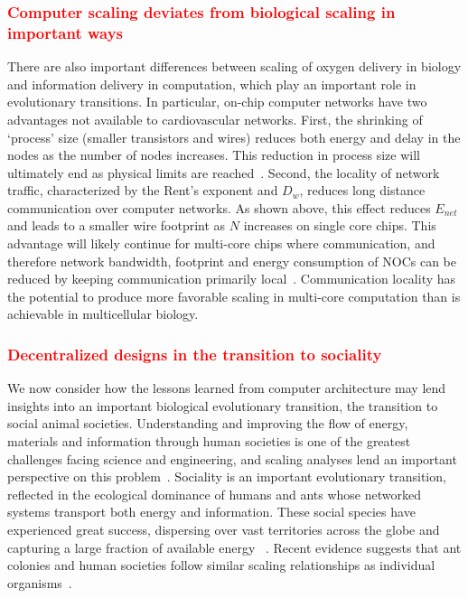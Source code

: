 \documentclass[12pt]{article}
\newcommand{\red}[1]{\textcolor{red}{#1}}
\begin{document}
\red{\subsubsection{Computer scaling deviates from biological scaling in important ways}} There are also important differences between scaling of oxygen delivery in biology and information
delivery in computation, which play an important role in evolutionary
transitions. In particular, on-chip computer networks have two advantages not
available to cardiovascular networks.  First, the shrinking of
`process' size (smaller
transistors and wires) reduces both energy and
delay in the nodes as the number of nodes increases.
This reduction in process size will ultimately end
as physical limits are reached~\cite{waldrop2016chips}.
Second, the locality of
network traffic, characterized by the Rent's exponent and $D_w$, reduces long
distance communication over computer networks. As shown above, this
effect
reduces $E_{net}$ and leads to a smaller wire footprint as $N$
increases on single core chips. This advantage will likely continue for
multi-core chips where communication, and therefore network bandwidth,
footprint and energy consumption of NOCs can be reduced by keeping
communication primarily local~\cite{bezerra2010modeling, zarkesh2010hybrid}. Communication locality
has the potential to produce more favorable scaling in multi-core
computation than is achievable in multicellular biology.

\red{\subsubsection{Decentralized designs in the transition to sociality}}  We now
consider how the lessons learned from computer architecture may lend insights into an important
biological evolutionary transition, the transition to social animal societies. Understanding and improving the flow of energy, materials and information through human societies is one of the greatest challenges facing science and engineering, and scaling analyses lend an important perspective on this problem~\cite{moses2012beyond}.
Sociality is an important evolutionary transition, reflected in the
ecological dominance of humans and ants whose networked
systems transport both energy and information. These social species have experienced great success, dispersing over vast territories across the globe and capturing a large
fraction of available energy ~\cite{haberl2007quantifying, holldobler1990ants}. Recent evidence suggests that ant colonies and human societies follow similar scaling relationships as individual organisms~\cite{moses2003allometry, bettencourt2007growth, burnside2012human, hou2010energetic, waters2010allometric}. 
\end{document}
